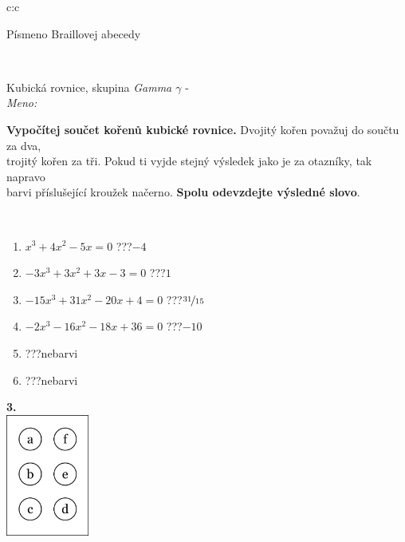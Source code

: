 \documentclass[10pt]{report}
\begin{document}
\begin{tabular}{c:c}
\begin{minipage}[c][104.5mm][t]{0.5\linewidth}
\begin{center}
\begin{minipage}{0.20\linewidth}
\begin{center}
{\small Písmeno Braillovej abecedy}
\end{center}
\end{minipage}
\end{center}
\end{minipage}
\\ \hdashline
\begin{minipage}[c][104.5mm][t]{0.5\linewidth}
\begin{center}
\vspace{7mm}
{\huge Kubická rovnice, skupina \textit{Gamma $\gamma$} -}\\[5mm]
\textit{Meno:}\phantom{xxxxxxxxxxxxxxxxxxxxxxxxxxxxxxxxxxxxxxxxxxxxxxxxxxxxxxxxxxxxxxxxx}\\[5mm]
\begin{minipage}{0.95\linewidth}
\textbf{Vypočítej součet kořenů kubické rovnice.} Dvojitý kořen považuj do součtu za dva,\\trojitý kořen za tři. Pokud ti vyjde stejný výsledek jako je za otazníky, tak napravo\\barvi příslušející kroužek načerno. \textbf{Spolu odevzdejte výsledné slovo}.
\end{minipage}
\\[1mm]
\begin{minipage}{0.79\linewidth}
\begin{center}
\begin{varwidth}{\linewidth}
\begin{enumerate}
\Large
\item $x^3+4x^2-5x=0$\quad \dotfill\; ???\;\dotfill \quad $-4$
\item $-3x^3+3x^2+3x-3=0$\quad \dotfill\; ???\;\dotfill \quad $1$
\item $-15x^3+31x^2-20x+4=0$\quad \dotfill\; ???\;\dotfill \quad $\nicefrac{31}{15}$
\item $-2x^3-16x^2-18x+36=0$\quad \dotfill\; ???\;\dotfill \quad $-10$
\item \quad \dotfill\; ???\;\dotfill \quad nebarvi
\item \quad \dotfill\; ???\;\dotfill \quad nebarvi
\end{enumerate}
\end{varwidth}
\end{center}
\end{minipage}
\begin{minipage}{0.20\linewidth}
\begin{center}
{\Huge\bfseries 3.} \\[2mm]
\includegraphics[height=40mm]{../images/braille.png}

\end{center}
\end{minipage}
\end{center}
\end{minipage}
\end{tabular}
\end{document}

